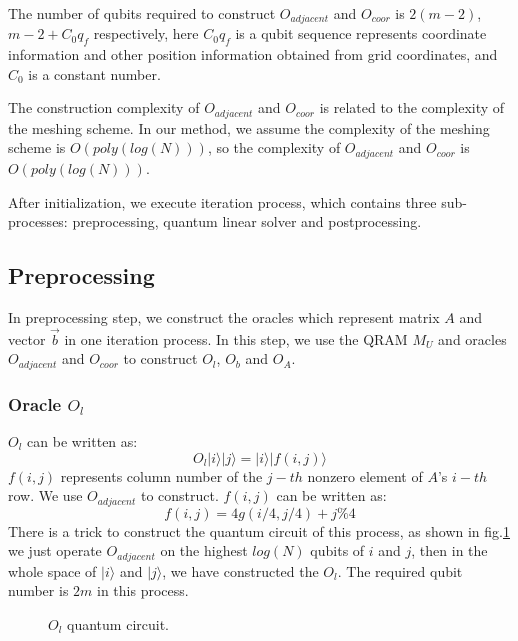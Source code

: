 \documentclass[%
 reprint,
 amsmath,amssymb,
pra,
]{revtex4-1}
\begin{document}
The number of qubits required to construct $O_{adjacent}$ and $O_{coor}$ is $2(m-2)$, $m-2+C_0q_f$ respectively, here $C_0q_f$ is a qubit sequence represents coordinate information and other position information obtained from grid coordinates, and $C_0$ is a constant number.

The construction complexity of $O_{adjacent}$ and $O_{coor}$ is related to the complexity of the meshing scheme. In our method, we assume the complexity of the meshing scheme is $O(poly(log(N)))$, so the complexity of $O_{adjacent}$ and $O_{coor}$ is $O(poly(log(N)))$. 

After initialization, we execute iteration process, which contains three sub-processes: preprocessing, quantum linear solver and postprocessing.

\subsection{Preprocessing}

In preprocessing step, we construct the oracles which represent matrix $A$ and vector $\vec{b}$ in one iteration process. In this step, we use the QRAM $M_U$ and oracles $O_{adjacent}$ and $O_{coor}$ to construct $O_l$, $O_b$ and $O_A$. 

\subsubsection{Oracle $O_l$}
$O_l$ can be written as:
$$
O_l|i\rangle|j\rangle=|i\rangle|f(i,j)\rangle
$$
$f(i,j)$ represents column number of the $j-th$ nonzero element of $A$'s $i-th$ row. We use $O_{adjacent}$ to construct. $f(i,j)$ can be written as:
$$
f(i,j)=4g(i/4,j/4)+j\%4
$$
There is a trick to construct the quantum circuit of this process, as shown in fig.\ref{OL} we just operate $O_{adjacent}$ on the highest $log(N)$ qubits of $i$ and $j$, then in the whole space of $|i\rangle$ and $|j\rangle$, we have constructed the $O_l$. The required qubit number is $2m$ in this process. 

\begin{figure}[htbp]
    \caption{$O_l$ quantum circuit. }
    \label{OL}
\end{figure}
\end{document}
